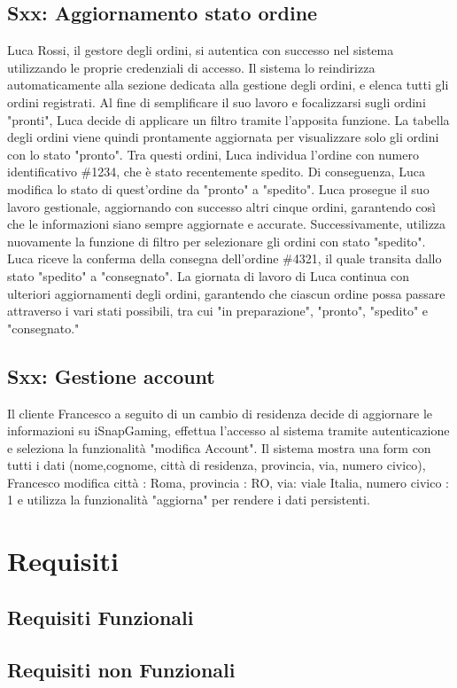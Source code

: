 \documentclass[12pt, a4paper, oneside]{book}
\begin{document}
    \subsection*{Sxx: Aggiornamento stato ordine}
        Luca Rossi, il gestore degli ordini, si autentica con successo nel sistema utilizzando le proprie
        credenziali di accesso. Il sistema lo reindirizza automaticamente alla sezione dedicata alla gestione
        degli ordini, e elenca tutti gli ordini registrati.
        Al fine di semplificare il suo lavoro e focalizzarsi sugli ordini "pronti", Luca decide di applicare
        un filtro tramite l'apposita funzione. La tabella degli ordini viene quindi prontamente aggiornata per
        visualizzare solo gli ordini con lo stato "pronto". Tra questi ordini, Luca individua l'ordine con numero
        identificativo \#1234, che è stato recentemente spedito. Di conseguenza, Luca modifica lo stato di
        quest'ordine da "pronto" a "spedito". Luca prosegue il suo lavoro gestionale, aggiornando con successo
        altri cinque ordini, garantendo così che le informazioni siano sempre aggiornate e accurate.
        Successivamente, utilizza nuovamente la funzione di filtro per selezionare gli ordini con stato "spedito".
        Luca riceve la conferma della consegna dell'ordine \#4321, il quale transita dallo stato "spedito" a
        "consegnato". La giornata di lavoro di Luca continua con ulteriori aggiornamenti degli ordini,
        garantendo che ciascun ordine possa passare attraverso i vari stati possibili, tra cui "in preparazione",
        "pronto", "spedito" e "consegnato."

    \subsection*{Sxx: Gestione account}
        Il cliente Francesco a seguito di un cambio di residenza decide di aggiornare le informazioni su
        iSnapGaming, effettua l'accesso al sistema tramite autenticazione e  seleziona la funzionalità
        "modifica Account". Il sistema mostra una form con tutti i dati (nome,cognome, città di residenza,
        provincia, via, numero civico), Francesco modifica città : Roma, provincia : RO, via: viale Italia,
        numero civico : 1 e utilizza la funzionalità "aggiorna" per rendere i dati persistenti.

\section*{Requisiti}
    \subsection*{Requisiti Funzionali}

    \subsection*{Requisiti non Funzionali}
\end{document}
